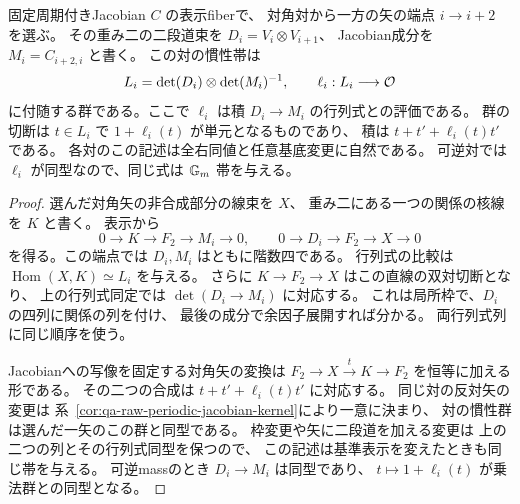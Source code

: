 \begin{corollary}[固定Jacobianのmass慣性帯の行列式表示]
\label{cor:qa-mass-band-determinant}
固定周期付きJacobian $C$ の表示fiberで、
対角対から一方の矢の端点 $i\to i+2$ を選ぶ。
その重み二の二段道束を $D_i=V_i\otimes V_{i+1}$、
Jacobian成分を $M_i=C_{i+2,i}$ と書く。
この対の慣性帯は
\[
 L_i=\det(D_i)\otimes\det(M_i)^{-1},\qquad
 \ell_i:L_i\longrightarrow\mathcal O
\]
に付随する群である。ここで $\ell_i$ は積
$D_i\to M_i$ の行列式との評価である。
群の切断は $t\in L_i$ で $1+\ell_i(t)$ が単元となるものであり、
積は $t+t'+\ell_i(t)t'$ である。
各対のこの記述は全右同値と任意基底変更に自然である。
可逆対では $\ell_i$ が同型なので、同じ式は $\mathbb G_m$ 帯を与える。
\end{corollary}
\begin{proof}
選んだ対角矢の非合成部分の線束を $X$、
重み二にある一つの関係の核線を $K$ と書く。
表示から
\[
 0\longrightarrow K\longrightarrow F_2\longrightarrow M_i
   \longrightarrow0,\qquad
 0\longrightarrow D_i\longrightarrow F_2\longrightarrow X
   \longrightarrow0
\]
を得る。この端点では $D_i,M_i$ はともに階数四である。
行列式の比較は
$\operatorname{Hom}(X,K)\simeq L_i$ を与える。
さらに $K\to F_2\to X$ はこの直線の双対切断となり、
上の行列式同定では $\det(D_i\to M_i)$ に対応する。
これは局所枠で、$D_i$ の四列に関係の列を付け、
最後の成分で余因子展開すれば分かる。
両行列式列に同じ順序を使う。

Jacobianへの写像を固定する対角矢の変換は
$F_2\to X\xrightarrow{t}K\to F_2$ を恒等に加える形である。
その二つの合成は
$t+t'+\ell_i(t)t'$ に対応する。
同じ対の反対矢の変更は
系~\ref{cor:qa-raw-periodic-jacobian-kernel}により一意に決まり、
対の慣性群は選んだ一矢のこの群と同型である。
枠変更や矢に二段道を加える変更は
上の二つの列とその行列式同型を保つので、
この記述は基準表示を変えたときも同じ帯を与える。
可逆massのとき $D_i\to M_i$ は同型であり、
$t\mapsto1+\ell_i(t)$ が乗法群との同型となる。
\end{proof}

